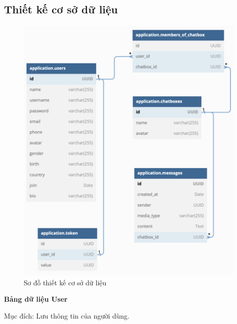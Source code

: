\documentclass[../DoAn.tex]{subfiles}
\begin{document}
\subsection{Thiết kế cơ sở dữ liệu}
\begin{figure}[H]
    \centering
    \includegraphics[width=1\linewidth]{Hinhve/Database/Database.png}
    \caption{Sơ đồ thiết kế cơ sở dữ liệu}
    \label{fig:use_case_tổng_quan}
\end{figure}


\newpage
\textbf{Bảng dữ liệu User}

Mục đích: Lưu thông tin của người dùng.
\end{document}

